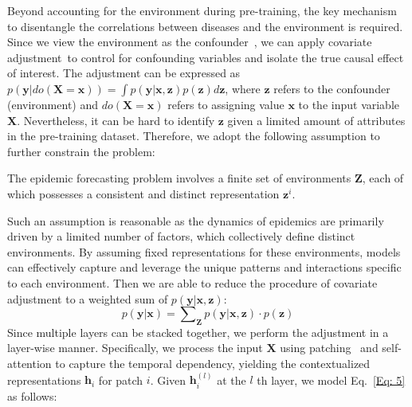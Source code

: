 Beyond accounting for the environment during pre-training, the key mechanism to disentangle the correlations between diseases and the environment is required. Since we view the environment as the confounder~\cite{ming2022impact}, we can apply covariate adjustment~\cite{runge2023causal}to control for confounding variables and isolate the true causal effect of interest. The adjustment can be expressed as $p(\mathbf{y} | do(\mathbf{X}=\mathbf{x})) = \int p(\mathbf{y} | \mathbf{x}, \mathbf{z}) p(\mathbf{z}) d\mathbf{z}$, where $\mathbf{z}$ refers to the confounder (environment) and $do(\mathbf{X}=\mathbf{x})$ refers to assigning value $\mathbf{x}$ to the input variable $\mathbf{X}$. Nevertheless, it can be hard to identify $\mathbf{z}$ given a limited amount of attributes in the pre-training dataset. Therefore, we adopt the following assumption to further constrain the problem:


\begin{assumption}
\label{assumption1}
The epidemic forecasting problem involves a finite set of environments $\mathbf{Z}$, each of which possesses a consistent and distinct representation $\mathbf{z}^i$.
\end{assumption}

Such an assumption is reasonable as the dynamics of epidemics are primarily driven by a limited number of factors, which collectively define distinct environments. By assuming fixed representations for these environments, models can effectively capture and leverage the unique patterns and interactions specific to each environment. Then we are able to reduce the procedure of covariate adjustment to a weighted sum of $p(\mathbf{y}|\mathbf{x},\mathbf{z})$:
\begin{equation}
\label{Eq: 5}
p(\mathbf{y} | \mathbf{x}) = \sum\nolimits_{\mathbf{Z}} p(\mathbf{y} | \mathbf{x}, \mathbf{z}) \cdot p(\mathbf{z})   \tag{1}
\end{equation}
Since multiple layers can be stacked together, we perform the adjustment in a layer-wise manner. Specifically, we process the input $\mathbf{X}$ using patching~\cite{nie2022time} and self-attention to capture the temporal dependency, yielding the contextualized representations $\mathbf{h}_i$ for patch $i$. Given $\mathbf{h}_i^{(l)}$ at the $l$ th layer, we model Eq.~\ref{Eq: 5} as follows:

